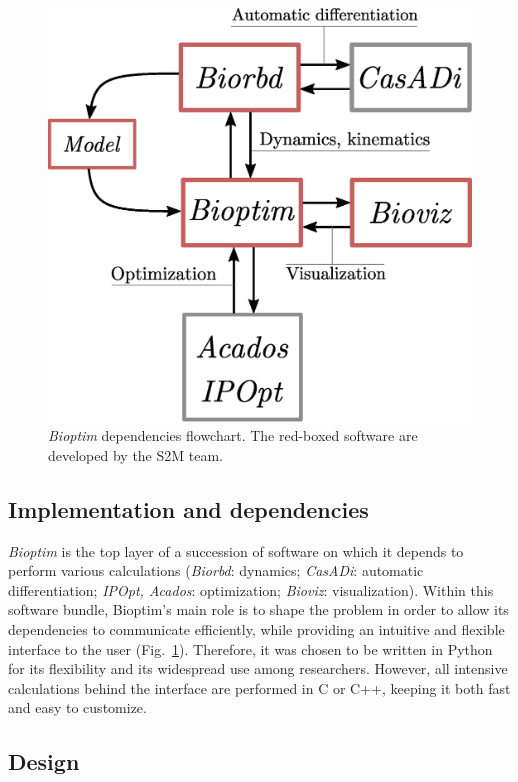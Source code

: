 \begin{figure}[t!]
\centering
\includegraphics[width=0.9\columnwidth]{figures/dependencies.eps}
\caption{\textit{Bioptim} dependencies flowchart. The red-boxed software are developed by the S2M team.}
\label{fig:dependencies}
\vspace*{-0.5cm}
\end{figure}


\subsection{Implementation and dependencies}

\textit{Bioptim} is the top layer of a succession of software on which it depends to perform various calculations (\textit{Biorbd}: dynamics; \textit{CasADi}: automatic differentiation; \textit{IPOpt, Acados}: optimization; \textit{Bioviz}: visualization).
Within this software bundle, Bioptim's main role is to shape the problem in order to allow its dependencies to communicate efficiently, while providing an intuitive and flexible interface to the user (Fig.~\ref{fig:dependencies}).
Therefore, it was chosen to be written in Python for its flexibility and its widespread use among researchers.
However, all intensive calculations behind the interface are performed in C or C++, keeping it both fast and easy to customize.

\subsection{Design}

